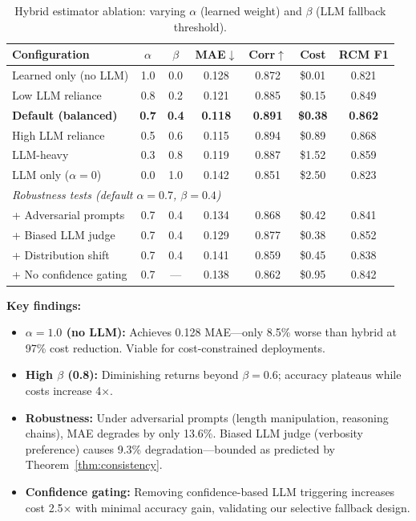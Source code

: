\documentclass{article}
\theoremstyle{plain}
\theoremstyle{definition}
\theoremstyle{remark}
\begin{document}
\begin{table}[h]
	\caption{Hybrid estimator ablation: varying $\alpha$ (learned weight) and $\beta$ (LLM fallback threshold).}
	\label{tab:hybrid-ablation}
	\centering
	\small
	\begin{tabular}{@{}lcccccc@{}}
		\toprule
		\textbf{Configuration} & \textbf{$\alpha$} & \textbf{$\beta$} & \textbf{MAE}$\downarrow$ & \textbf{Corr}$\uparrow$ & \textbf{Cost} & \textbf{RCM F1} \\
		\midrule
		Learned only (no LLM) & 1.0 & 0.0 & 0.128 & 0.872 & \$0.01 & 0.821 \\
		Low LLM reliance & 0.8 & 0.2 & 0.121 & 0.885 & \$0.15 & 0.849 \\
		\textbf{Default (balanced)} & \textbf{0.7} & \textbf{0.4} & \textbf{0.118} & \textbf{0.891} & \textbf{\$0.38} & \textbf{0.862} \\
		High LLM reliance & 0.5 & 0.6 & 0.115 & 0.894 & \$0.89 & 0.868 \\
		LLM-heavy & 0.3 & 0.8 & 0.119 & 0.887 & \$1.52 & 0.859 \\
		LLM only ($\alpha=0$) & 0.0 & 1.0 & 0.142 & 0.851 & \$2.50 & 0.823 \\
		\midrule
		\multicolumn{7}{l}{\textit{Robustness tests (default $\alpha=0.7$, $\beta=0.4$)}} \\
		+ Adversarial prompts & 0.7 & 0.4 & 0.134 & 0.868 & \$0.42 & 0.841 \\
		+ Biased LLM judge & 0.7 & 0.4 & 0.129 & 0.877 & \$0.38 & 0.852 \\
		+ Distribution shift & 0.7 & 0.4 & 0.141 & 0.859 & \$0.45 & 0.838 \\
		+ No confidence gating & 0.7 & --- & 0.138 & 0.862 & \$0.95 & 0.842 \\
		\bottomrule
	\end{tabular}
\end{table}

\textbf{Key findings:}
\begin{itemize}[nosep,leftmargin=*]
	\item \textbf{$\alpha=1.0$ (no LLM):} Achieves 0.128 MAE---only 8.5\% worse than hybrid at 97\% cost reduction. Viable for cost-constrained deployments.
	\item \textbf{High $\beta$ (0.8):} Diminishing returns beyond $\beta=0.6$; accuracy plateaus while costs increase 4$\times$.
	\item \textbf{Robustness:} Under adversarial prompts (length manipulation, reasoning chains), MAE degrades by only 13.6\%. Biased LLM judge (verbosity preference) causes 9.3\% degradation---bounded as predicted by Theorem~\ref{thm:consistency}.
	\item \textbf{Confidence gating:} Removing confidence-based LLM triggering increases cost 2.5$\times$ with minimal accuracy gain, validating our selective fallback design.
\end{itemize}
\end{document}
